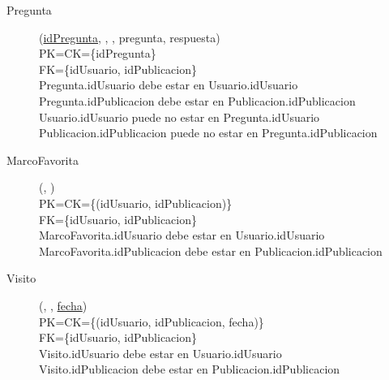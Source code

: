 \begin{description}
  \item[Pregunta](\underline{idPregunta}, , , pregunta, respuesta)\\
PK=CK=\{idPregunta\}\\
FK=\{idUsuario, idPublicacion\}\\
Pregunta.idUsuario debe estar en Usuario.idUsuario\\
Pregunta.idPublicacion debe estar en Publicacion.idPublicacion\\
Usuario.idUsuario puede no estar en Pregunta.idUsuario\\
Publicacion.idPublicacion puede no estar en Pregunta.idPublicacion

  \item[MarcoFavorita](\underline{}, \underline{})\\
PK=CK=\{(idUsuario, idPublicacion)\}\\
FK=\{idUsuario, idPublicacion\}\\
MarcoFavorita.idUsuario debe estar en Usuario.idUsuario\\
MarcoFavorita.idPublicacion debe estar en Publicacion.idPublicacion

  \item[Visito](\underline{}, \underline{}, \underline{fecha})\\
PK=CK=\{(idUsuario, idPublicacion, fecha)\}\\
FK=\{idUsuario, idPublicacion\}\\
Visito.idUsuario debe estar en Usuario.idUsuario\\
Visito.idPublicacion debe estar en Publicacion.idPublicacion

\end{description}

\newpage
